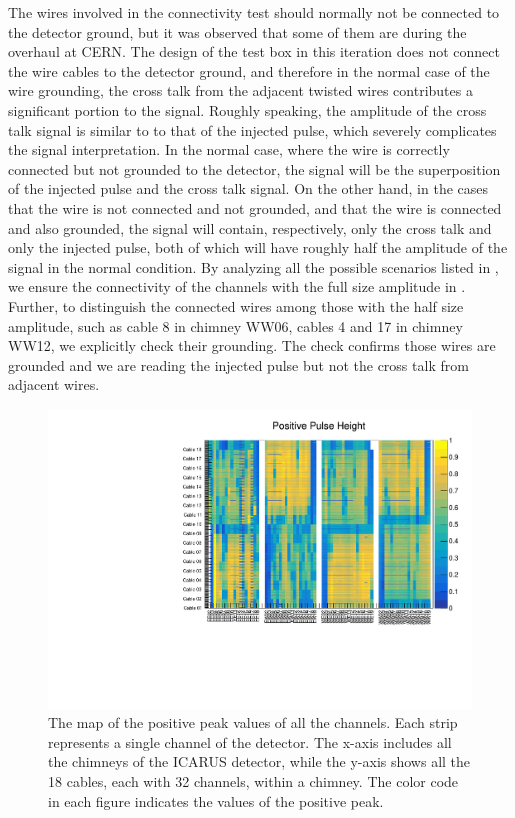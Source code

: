 The wires involved in the connectivity test should normally not be connected
to the detector ground, but it was observed that some of them are during the
overhaul at CERN.
The design of the test box in this iteration does not connect the wire cables
to the detector ground, and therefore in the normal case of the wire grounding,
the cross talk from the adjacent twisted wires contributes a significant
portion to the signal.
Roughly speaking, the amplitude of the cross talk signal is similar to
to that of the injected pulse, which severely complicates the signal
interpretation.
In the normal case, where the wire is correctly connected but not grounded 
to the detector, the signal will be the superposition of the injected
pulse and the cross talk signal.
On the other hand, in the cases that the wire is not connected and not
grounded, and that the wire is connected and also grounded,
the signal will contain, respectively, only the cross talk and only the
injected pulse, both of which will have roughly half the amplitude of
the signal in the normal condition.
By analyzing all the possible scenarios listed in ,
we ensure the connectivity of the channels with the full size amplitude in
.
Further, to distinguish the connected wires among those with the half 
size amplitude, such as cable 8 in chimney WW06, cables 4 and 17 in chimney WW12,
we explicitly check their grounding.
The check confirms those wires are grounded and we are reading the injected
pulse but not the cross talk from adjacent wires.\\



\begin{figure}
\centering
\includegraphics[width=\textwidth]{fig/PosPeak.pdf}
\caption{The map of the positive peak values of all the channels.
Each strip represents a single channel of the detector.
The x-axis includes all the chimneys of the ICARUS detector, while
the y-axis shows all the 18 cables, each with 32 channels, within a chimney.
The color code in each figure indicates the values of the positive peak.}
\label{fig:pospeak}
\end{figure}

